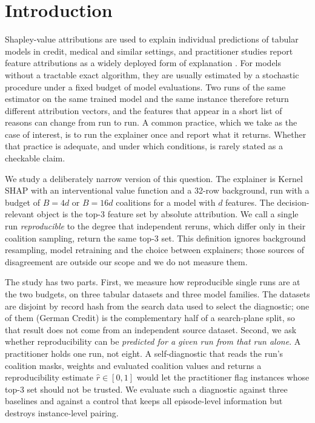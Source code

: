 \documentclass{article}
\newcommand{\rhat}{\hat r}
\begin{document}
\section{Introduction}
Shapley-value attributions \citep{Lundberg2017Unified} are used to explain individual predictions of tabular models in credit, medical and similar settings, and practitioner studies report feature attributions as a widely deployed form of explanation \citep{Bhatt2020Explainable}. For models without a tractable exact algorithm, they are usually estimated by a stochastic procedure under a fixed budget of model evaluations. Two runs of the same estimator on the same trained model and the same instance therefore return different attribution vectors, and the features that appear in a short list of reasons can change from run to run. A common practice, which we take as the case of interest, is to run the explainer once and report what it returns. Whether that practice is adequate, and under which conditions, is rarely stated as a checkable claim.

We study a deliberately narrow version of this question. The explainer is Kernel SHAP with an interventional value function and a 32-row background, run with a budget of $B=4d$ or $B=16d$ coalitions for a model with $d$ features. The decision-relevant object is the top-3 feature set by absolute attribution. We call a single run \emph{reproducible} to the degree that independent reruns, which differ only in their coalition sampling, return the same top-3 set. This definition ignores background resampling, model retraining and the choice between explainers; those sources of disagreement are outside our scope and we do not measure them.

The study has two parts. First, we measure how reproducible single runs are at the two budgets, on three tabular datasets and three model families. The datasets are disjoint by record hash from the search data used to select the diagnostic; one of them (German Credit) is the complementary half of a search-plane split, so that result does not come from an independent source dataset. Second, we ask whether reproducibility can be \emph{predicted for a given run from that run alone}. A practitioner holds one run, not eight. A self-diagnostic that reads the run's coalition masks, weights and evaluated coalition values and returns a reproducibility estimate $\rhat\in[0,1]$ would let the practitioner flag instances whose top-3 set should not be trusted. We evaluate such a diagnostic against three baselines and against a control that keeps all episode-level information but destroys instance-level pairing.
\end{document}
